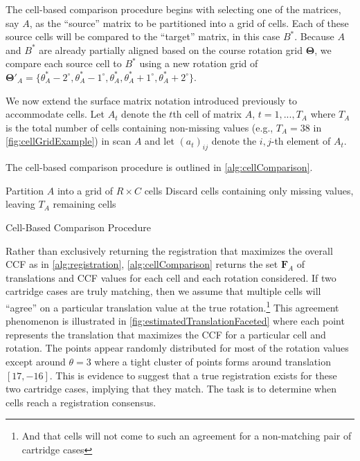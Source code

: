 \documentclass[
]{jdssv}
\begin{document}
The cell-based comparison procedure begins with selecting one of the
matrices, say \(A\), as the ``source'' matrix to be partitioned into a
grid of cells. Each of these source cells will be compared to the
``target'' matrix, in this case \(B^*\). Because \(A\) and \(B^*\) are
already partially aligned based on the course rotation grid
\(\pmb{\Theta}\), we compare each source cell to \(B^*\) using a new
rotation grid of
\(\pmb{\Theta}'_A = \{\theta^*_A - 2^\circ, \theta^*_A - 1^\circ,\theta^*_A,\theta^*_A + 1^\circ,\theta^*_A + 2^\circ\}\).

We now extend the surface matrix notation introduced previously to
accommodate cells. Let \(A_{t}\) denote the \(t\)th cell of matrix
\(A\), \(t = 1,...,T_A\) where \(T_A\) is the total number of cells
containing non-missing values (e.g., \(T_A = 38\) in
\autoref{fig:cellGridExample}) in scan \(A\) and let \((a_t)_{ij}\)
denote the \(i,j\)-th element of \(A_t\).

The cell-based comparison procedure is outlined in
\autoref{alg:cellComparison}.

\begin{algorithm}[H]
Partition $A$ into a grid of $R \times C$ cells\;
Discard cells containing only missing values, leaving $T_A$ remaining cells\;
\caption{Cell-Based Comparison Procedure}
\label{alg:cellComparison}
\end{algorithm}

Rather than exclusively returning the registration that maximizes the
overall CCF as in \autoref{alg:registration},
\autoref{alg:cellComparison} returns the set \(\pmb{F}_A\) of
translations and CCF values for each cell and each rotation considered.
If two cartridge cases are truly matching, then we assume that multiple
cells will ``agree'' on a particular translation value at the true
rotation.\footnote{And that cells will not come to such an agreement for a non-matching pair of cartridge cases}
This agreement phenomenon is illustrated in
\autoref{fig:estimatedTranslationFaceted} where each point represents
the translation that maximizes the CCF for a particular cell and
rotation. The points appear randomly distributed for most of the
rotation values except around \(\theta = 3\) where a tight cluster of
points forms around translation \([17,-16]\). This is evidence to
suggest that a true registration exists for these two cartridge cases,
implying that they match. The task is to determine when cells reach a
registration consensus.
\end{document}
